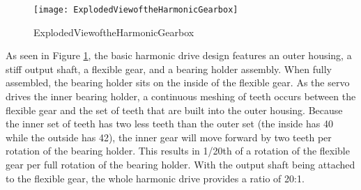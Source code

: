 \begin{figure}[htp]
  \centering
  \texttt{[image: ExplodedViewoftheHarmonicGearbox]}
  \caption{ExplodedViewoftheHarmonicGearbox}
  \label{fig:ExplodedViewoftheHarmonicGearbox}
\end{figure}

As seen in Figure \ref{fig:ExplodedViewoftheHarmonicGearbox}, the basic harmonic drive design features an outer housing, a stiff output shaft, a flexible gear, and a bearing holder assembly. When fully assembled, the bearing holder sits on the inside of the flexible gear. As the servo drives the inner bearing holder, a continuous meshing of teeth occurs between the flexible gear and the set of teeth that are built into the outer housing. Because the inner set of teeth has two less teeth than the outer set (the inside has 40 while the outside has 42), the inner gear will move forward by two teeth per rotation of the bearing holder. This results in 1/20th of a rotation of the flexible gear per full rotation of the bearing holder. With the output shaft being attached to the flexible gear, the whole harmonic drive provides a ratio of 20:1.


